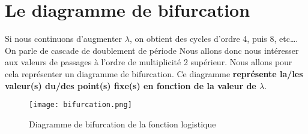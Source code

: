 \newpage
\section{Le diagramme de bifurcation}
Si nous continuons d'augmenter $\lambda$, on obtient des cycles d'ordre 4, puis 8, etc\dots. On parle de cascade de doublement de période
Nous allons donc nous intéresser aux valeurs de passages à l'ordre de multiplicité 2 supérieur. Nous allons pour cela représenter un diagramme de bifurcation. Ce diagramme \textbf{représente la/les valeur(s) du/des point(s) fixe(s) en fonction de la valeur de $\lambda$}.

\begin{figure}[!ht]
    \begin{center}
        \texttt{[image: bifurcation.png]}
    \end{center}
    \caption{\label{fig:bifurcation}Diagramme de bifurcation de la fonction logistique}
\end{figure}

